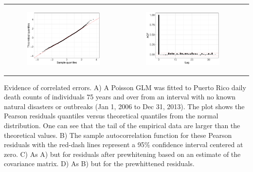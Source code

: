 \documentclass[11pt]{article}
\begin{document}
\begin{suppfigure}[ht]
\begin{tabular}{lll}
\begin{subfigure}[t]{0.49\linewidth}
		\includegraphics[width=1\linewidth]{figs/supp-figure-7c.pdf}
	\end{subfigure}&
	\begin{subfigure}[t]{0.49\linewidth}
    	\centering
	    \includegraphics[width=1\linewidth]{figs/supp-figure-7d.pdf}
    \end{subfigure}\\
    \end{tabular}
    \caption{Evidence of correlated errors. A) A Poisson GLM was fitted to Puerto Rico daily death counts of individuals 75 years and over from an interval with no known natural disasters or outbreaks (Jan 1, 2006 to Dec 31, 2013). The plot shows the Pearson residuals quantiles versus theoretical quantiles from the normal distribution. One can see that the tail of the empirical data are larger than the theoretical values. B) The sample autocorrelation function for these Pearson residuals with the red-dash lines represent a 95\% confidence interval centered at zero. C) As A) but for residuals after prewhitening based on an estimate of the covariance matrix. D) As B) but for the prewhittened residuals.}
    \label{supp-fig:correlated-errors}
\end{suppfigure}
\end{document}
